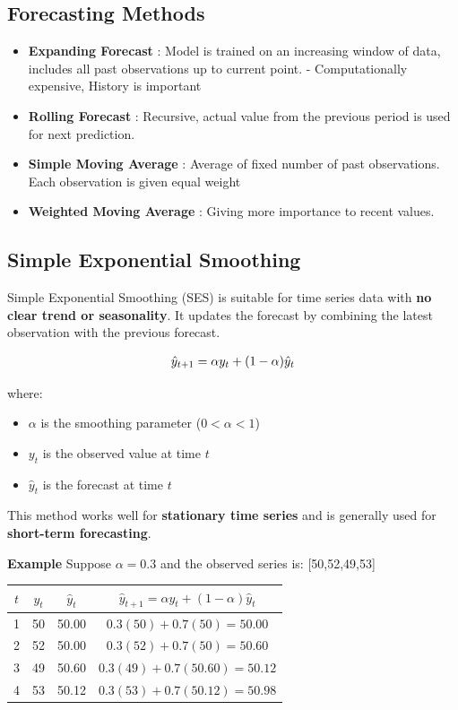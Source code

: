 \documentclass[10pt,a4paper]{article}
\begin{document}
	\subsection{Forecasting Methods}
	\begin{itemize}
	    \item \textbf{Expanding Forecast} : Model is trained on an increasing window of data, includes all past observations up to current point. - Computationally expensive, History is important
	    \item \textbf{Rolling Forecast} : Recursive, actual value from the previous period is used for next prediction.
	    \item \textbf{Simple Moving Average} : Average of fixed number of past observations. Each observation is given equal weight
	    \item \textbf{Weighted Moving Average} : Giving more importance to recent values.
	\end{itemize}
	
	\subsection{Simple Exponential Smoothing}
	
	Simple Exponential Smoothing (SES) is suitable for time series data with \textbf{no clear trend or seasonality}. It updates the forecast by combining the latest observation with the previous forecast.
	
	\begin{align*}
	\large \hat{y}_{t+1} = \alpha y_t + (1-\alpha)\hat{y}_t
	\end{align*}
	
	where:
	\begin{itemize}
	\item $\alpha$ is the smoothing parameter ($0 < \alpha < 1$)
	\item $y_t$ is the observed value at time $t$
	\item $\hat{y}_t$ is the forecast at time $t$
	\end{itemize}
	
	This method works well for \textbf{stationary time series} and is generally used for \textbf{short-term forecasting}.
	
	\medskip
	
	\textbf{Example} Suppose $\alpha = 0.3$ and the observed series is: [50,52,49,53]
	
	\begin{center}
	\begin{tabular}{c|c|c|c}
	\hline
	$t$ & $y_t$ & $\hat{y}_t$ & $\hat{y}_{t+1} = \alpha y_t + (1-\alpha)\hat{y}_t$ \\
	\hline
	1 & 50 & 50.00 & $0.3(50) + 0.7(50) = 50.00$ \\
	2 & 52 & 50.00 & $0.3(52) + 0.7(50) = 50.60$ \\
	3 & 49 & 50.60 & $0.3(49) + 0.7(50.60) = 50.12$ \\
	4 & 53 & 50.12 & $0.3(53) + 0.7(50.12) = 50.98$ \\
	\hline
	\end{tabular}
	\end{center}
	
\end{document}
